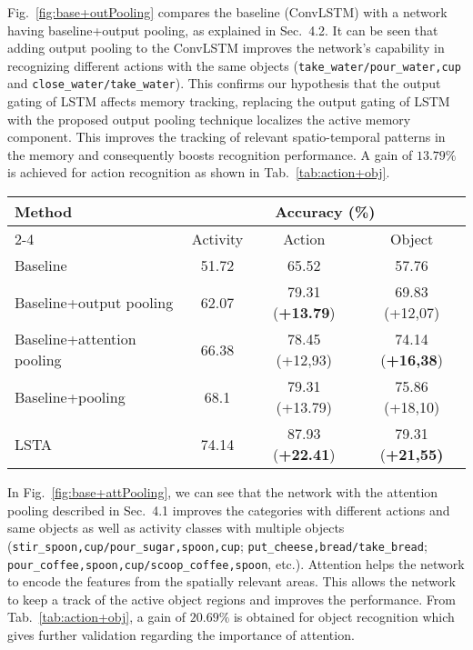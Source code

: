 \documentclass[10pt,twocolumn,letterpaper]{article}
\begin{document}
Fig.~\ref{fig:base+outPooling} compares the baseline (ConvLSTM) with a network having baseline+output pooling, as explained in Sec.~4.2. It can be seen that adding output pooling to the ConvLSTM improves the network's capability in recognizing different actions with the same objects (\verb+take_water/pour_water,cup+ and \verb+close_water/take_water+). This confirms our hypothesis that the output gating of LSTM affects memory tracking, replacing the output gating of LSTM with the proposed output pooling technique localizes the active memory component. This improves the tracking of relevant spatio-temporal patterns in the memory and consequently boosts recognition performance. A gain of $13.79\%$ is achieved for action recognition as shown in Tab.~\ref{tab:action+obj}.
	
	\begin{table*}[t!]\small
	\centering
	\begin{tabular}{|l|c|c|c|}
		\hline
		\multirow{2}{*}{Method} & \multicolumn{3}{c|}{Accuracy (\%)}\\ \cline{2-4}
		& Activity & Action & Object\\ 
		\hline \hline
        Baseline & 51.72 & 65.52 & 57.76\\
        \hline
        Baseline+output pooling & 62.07 & 79.31 ({\bf+13.79}) & 69.83 ({+12,07})\\ \hline
        Baseline+attention pooling & 66.38 & 78.45 (+12,93) & 74.14 ({\bf+16,38}) \\ \hline
        Baseline+pooling & 68.1 & 79.31 (+13.79) & 75.86 (+18,10)\\ \hline
        LSTA & 74.14 & 87.93  ({\bf+22.41}) & 79.31 (\bf+21,55) \\ \hline
	\end{tabular}
	\caption{Detailed ablation analysis on GTEA 61 fixed split. We compute the action and object recognition score by decomposing the action and objects from the predicted activity label.}
	\label{tab:action+obj}
\end{table*}

	In Fig.~\ref{fig:base+attPooling}, we can see that the network with the attention pooling described in Sec.~4.1 improves the categories with different actions and same objects as well as activity classes with multiple objects (\verb+stir_spoon,cup/pour_sugar,spoon,cup+; \verb+put_cheese,bread/take_bread+; \verb+pour_coffee,spoon,cup/scoop_coffee,spoon+, etc.). 
Attention helps the network to encode the features from the spatially relevant areas. This allows the network to keep a track of the active object regions and improves the performance. From Tab.~\ref{tab:action+obj}, a gain of $20.69\%$ is obtained for object recognition which gives further validation regarding the importance of attention.  
\end{document}

